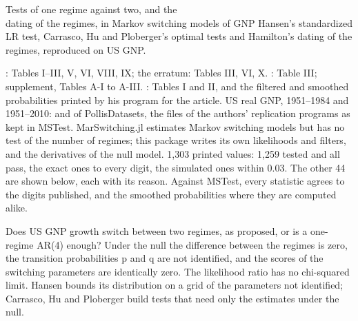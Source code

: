
\renewcommand{\vignetteauthor}{Antonio Saragga Seabra}
\renewcommand{\vignettedate}{6 November 2026}
\renewcommand{\vignettelicense}{MIT}



  {Tests of one regime against two, and the\\ dating of the regimes, in Markov switching models of GNP}
  {Hansen's standardized LR test, Carrasco, Hu and Ploberger's optimal tests and Hamilton's dating of the regimes, reproduced on US GNP.}

\factsheet
  {: Tables I--III, V, VI, VIII, IX; the  erratum: Tables III, VI, X. : Table III; supplement, Tables A-I to A-III. : Tables I and II, and the filtered and smoothed probabilities printed by his program for the article. US real GNP, 1951--1984 and 1951--2010:  and  of PollisDatasets, the files of the authors' replication programs as kept in MSTest.}
  {MarSwitching.jl estimates Markov switching models but has no test of the number of regimes; this package writes its own likelihoods and filters, and the derivatives of the null model.}
  {}
  {1,303 printed values: 1,259 tested and all pass, the exact ones to every digit, the simulated ones within 0.03. The other 44 are shown below, each with its reason. Against MSTest, every statistic agrees to the digits published, and the smoothed probabilities where they are computed alike.}

Does US GNP growth switch between two regimes, as  proposed, or is a one-regime AR(4) enough? Under the null the difference between the regimes is zero, the transition probabilities p and q are not identified, and the scores of the switching parameters are identically zero. The likelihood ratio has no chi-squared limit. Hansen bounds its distribution on a grid of the parameters not identified; Carrasco, Hu and Ploberger build tests that need only the estimates under the null.

